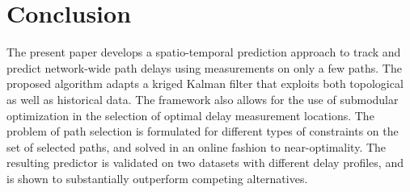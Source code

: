 \documentclass[draftcls,onecolumn,12pt]{IEEEtran}
\theoremstyle{plain}\newtheorem{thm}{Theorem}
\theoremstyle{definition}
\theoremstyle{remark}
\begin{document}
\section{Conclusion}
The present paper develops a spatio-temporal prediction approach to track and predict network-wide path delays using measurements on only a few paths.
The proposed algorithm adapts a kriged Kalman filter that exploits both topological as well as historical data.
The framework also allows for the use of submodular optimization in the selection of optimal delay measurement locations.
The problem of path selection is formulated for different types of constraints on the set of selected paths, and solved in an online fashion to near-optimality. 
The resulting predictor is validated on two datasets with different delay profiles, and is shown to substantially outperform competing alternatives.





\appendices
\end{document}
